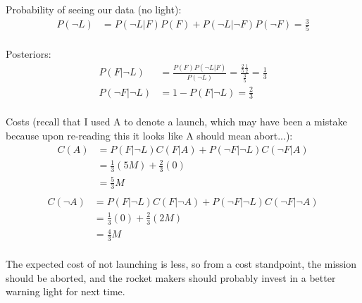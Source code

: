 \begin{enumerate}[label=\textbf{\Alph*}.]
    Probability of seeing our data (no light):
    \begin{align*}
        P(\neg L) &= P(\neg L|F)P(F) + P(\neg L|\neg F)P(\neg F) = \frac{3}{5} \\
    \end{align*}

    Posteriors:
    \begin{align*}
        P(F|\neg L) &= \frac{P(F) P(\neg L | F)}{P(\neg L)}
        = \frac{\frac{2}{5} \frac{1}{2}}{\frac{3}{5}} 
        = \frac{1}{3} \\
        P(\neg F|\neg L) &= 1 - P(F|\neg L)
        = \frac{2}{3} \\
    \end{align*}

    Costs (recall that I used A to denote a launch, which may have been a mistake because upon re-reading this it looks like A should mean abort...):
    \begin{align*}
        C(A) &= P(F|\neg L)C(F|A) + P(\neg F|\neg L)C(\neg F|A)\\
        &= \frac{1}{3}(5M) + \frac{2}{3}(0)\\
        &= \frac{5}{3}M\\
    \end{align*}
    \begin{align*}
        C(\neg A) &= P(F|\neg L)C(F|\neg A) + P(\neg F|\neg L)C(\neg F|\neg A)\\
        &= \frac{1}{3}(0) + \frac{2}{3}(2M)\\
        &= \frac{4}{3}M\\
    \end{align*}

    The expected cost of not launching is less, so from a cost standpoint, the mission should be aborted, and the rocket makers should probably invest in a better warning light for next time.

\end{enumerate}

